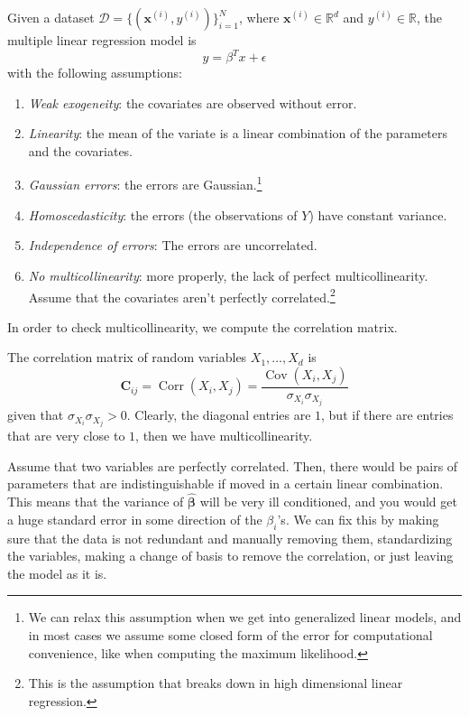 \documentclass{article}
\DeclareMathOperator{\Cov}{Cov}
\DeclareMathOperator{\Corr}{Corr}
\begin{document}
    \begin{definition}
      Given a dataset $\mathcal{D} = \{(\mathbf{x}^{(i)}, y^{(i)})\}_{i=1}^N$, where $\mathbf{x}^{(i)} \in \mathbb{R}^d$ and $y^{(i)} \in \mathbb{R}$, the multiple linear regression model is 
      \begin{equation}
        y = \beta^T x + \epsilon
      \end{equation}
      with the following assumptions: 
      \begin{enumerate}
        \item \textit{Weak exogeneity}: the covariates are observed without error.
        \item \textit{Linearity}: the mean of the variate is a linear combination of the parameters and the covariates.
        \item \textit{Gaussian errors}: the errors are Gaussian.\footnote{We can relax this assumption when we get into generalized linear models, and in most cases we assume some closed form of the error for computational convenience, like when computing the maximum likelihood.}
        \item \textit{Homoscedasticity}: the errors (the observations of $Y$) have constant variance. 
        \item \textit{Independence of errors}: The errors are uncorrelated.
        \item \textit{No multicollinearity}: more properly, the lack of perfect multicollinearity. Assume that the covariates aren't perfectly correlated.\footnote{This is the assumption that breaks down in high dimensional linear regression.} 
      \end{enumerate}
    \end{definition}

    In order to check multicollinearity, we compute the correlation matrix. 

    \begin{definition}
      The correlation matrix of random variables $X_1, \ldots, X_d$ is 
      \[\mathbf{C}_{ij} = \Corr(X_i, X_j) = \frac{\Cov(X_i, X_j)}{\sigma_{X_i} \sigma_{X_j}}\]
      given that $\sigma_{X_i} \sigma_{X_j} > 0$. Clearly, the diagonal entries are $1$, but if there are entries that are very close to $1$, then we have multicollinearity. 
    \end{definition}

    Assume that two variables are perfectly correlated. Then, there would be pairs of parameters that are indistinguishable if moved in a certain linear combination. This means that the variance of $\hat{\boldsymbol{\beta}}$ will be very ill conditioned, and you would get a huge standard error in some direction of the $\beta_i$'s. We can fix this by making sure that the data is not redundant and manually removing them, standardizing the variables, making a change of basis to remove the correlation, or just leaving the model as it is. 
\end{document}
